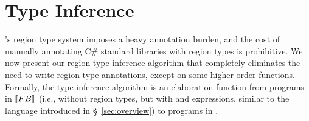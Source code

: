 \section{Type Inference}
\label{sec:type-inference}

\name's region type system imposes a heavy annotation burden, and the
cost of manually annotating C\# standard libraries with region types
is prohibitive. We now present our region type inference algorithm
that completely eliminates the need to write region type annotations,
except on some higher-order functions. Formally, the type inference
algorithm is an elaboration function from programs in $\llbracket {\sc FB} \rrbracket$
(i.e., \FB without region types, but with  and 
expressions, similar to the language introduced in
\S~\ref{sec:overview}) to programs in \FB.

